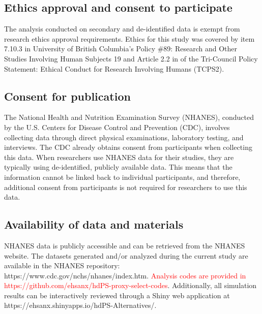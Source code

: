 \documentclass[10pt,letterpaper]{article}
\begin{document}
\subsection*{Ethics approval and consent to
participate}\label{ethics-approval-and-consent-to-participate}

The analysis conducted on secondary and de-identified data is exempt
from research ethics approval requirements. Ethics for this study was
covered by item 7.10.3 in University of British Columbia's Policy \#89:
Research and Other Studies Involving Human Subjects 19 and Article 2.2
in of the Tri-Council Policy Statement: Ethical Conduct for Research
Involving Humans (TCPS2).

\subsection*{Consent for publication}\label{consent-for-publication}

The National Health and Nutrition Examination Survey (NHANES), conducted
by the U.S. Centers for Disease Control and Prevention (CDC), involves
collecting data through direct physical examinations, laboratory
testing, and interviews. The CDC already obtains consent from
participants when collecting this data. When researchers use NHANES data
for their studies, they are typically using de-identified, publicly
available data. This means that the information cannot be linked back to
individual participants, and therefore, additional consent from
participants is not required for researchers to use this data.

\subsection*{Availability of data and
materials}\label{availability-of-data-and-materials}

NHANES data is publicly accessible and can be retrieved from the NHANES
website. The datasets generated and/or analyzed during the current study
are available in the NHANES repository:
https://www.cdc.gov/nchs/nhanes/index.htm.
\textcolor{red}{Analysis codes are provided in https://github.com/ehsanx/hdPS-proxy-select-codes}.
Additionally, all simulation results can be interactively reviewed
through a Shiny web application at
https://ehsanx.shinyapps.io/hdPS-Alternatives/.
\end{document}
